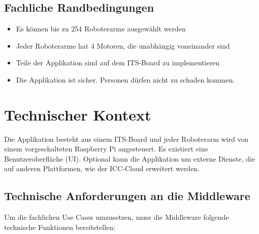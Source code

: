 \subsection{Fachliche Randbedingungen}

\begin{itemize}
	\item Es können bis zu 254 Roboterarme ausgewählt werden
	\item Jeder Roboterarme hat 4 Motoren, die unabhängig voneinander sind
	\item Teile der Applikation sind auf dem ITS-Board zu implementieren
	\item Die Applikation ist sicher. Personen dürfen nicht zu schaden kommen.
	
\end{itemize}



\section{Technischer Kontext}

Die Applikation besteht aus einem ITS-Board und jeder Roboterarm wird von einem vorgeschalteten Raspberry Pi angesteuert. Es existiert eine Benutzeroberfläche (UI). Optional kann die Applikation um externe Dienste, die auf anderen Plattformen, wie der ICC-Cloud erweitert werden.

\subsection{Technische Anforderungen an die Middleware}

Um die fachlichen Use Cases umzusetzen, muss die Middleware folgende technische Funktionen bereitstellen:

